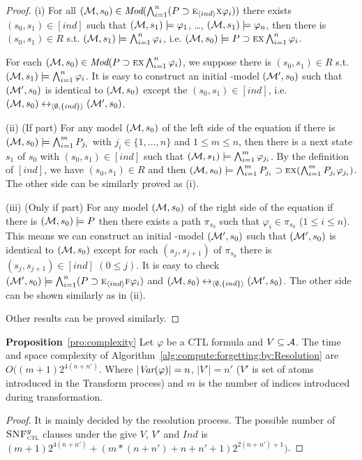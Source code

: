 \documentclass[letterpaper]{article} %
\begin{document}
\begin{proof}
(i)  For all $({\cal M}, s_0) \in \textit{Mod}(\bigwedge_{i=1}^n (P\supset \textsc{e}_{{\langle{ind}\rangle}} \textsc{x} \varphi_i))$ there exists $(s_0, s_1)\in [ind]$ such that $({\cal M}, s_1) \models \varphi_1$, \dots, $({\cal M}, s_1) \models \varphi_n$, then there is $(s_0, s_1)\in R$ s.t. $({\cal M}, s_1) \models \bigwedge_{i=1}^n \varphi_i$, i.e. $({\cal M}, s_0) \models P\supset \textsc{e} \textsc{x} \bigwedge_{i=1}^n \varphi_i$.

For each $({\cal M}, s_0) \in \textit{Mod}(P\supset \textsc{e} \textsc{x} \bigwedge_{i=1}^n \varphi_i)$, we suppose there is $(s_0, s_1)\in R$ s.t. $({\cal M}, s_1) \models \bigwedge_{i=1}^n \varphi_i$. It is easy to construct an initial \Ind-model $({\cal M}', s_0)$ such that $({\cal M}', s_0)$ is identical to $({\cal M}, s_0)$ except the $(s_0, s_1) \in [ind]$, i.e. $({\cal M}, s_0) \leftrightarrow_{{\langle{\emptyset, \{ind\}}\rangle}} ({\cal M}', s_0)$.

(ii) (If part) For any model $({\cal M},s_0)$ of the left side of the equation if there is $({\cal M},s_0) \models \bigwedge_{i=1}^m P_{j_i}$ with $j_i \in \{1, \dots, n\}$ and $1\leq m \leq n$, then there is a next state $s_1$ of $s_0$ with $(s_0, s_1) \in [ind]$ such that $({\cal M}, s_1) \models \bigwedge_{i=1}^m \varphi_{j_i}$. By the definition of $[ind]$, we have $(s_0, s_1) \in R$ and then $({\cal M}, s_0) \models \bigwedge_{i=1}^m P_{j_i} \supset \textsc{e} \textsc{x} (\bigwedge_{i=1}^m P_{j_i} \varphi_{j_i})$. The other side can be similarly proved as (i).

(iii) (Only if part) For any model $({\cal M},s_0)$ of the right side of the equation if there is $({\cal M},s_0) \models P$ then there exists a path $\pi_{s_0}$ such that $\varphi_i \in \pi_{s_0}$ ($1\leq i \leq n$). This means we can construct an initial \Ind-model $({\cal M}', s_0)$ such that $({\cal M}', s_0)$ is identical to $({\cal M}, s_0)$ except for each $(s_j, s_{j+1})$ of $\pi_{s_0}$ there is $(s_j, s_{j+1}) \in [ind]$ $(0\leq j)$. It is easy to check $({\cal M}', s_0) \models \bigwedge_{i=1}^n (P\supset \textsc{e}_{{\langle{ind}\rangle}} \textsc{f} \varphi_i)$ and  $({\cal M}, s_0) \leftrightarrow_{{\langle{\emptyset, \{ind\}}\rangle}} ({\cal M}', s_0)$.  The other side can be shown similarly as in (ii).

Other results can be proved similarly.
\end{proof}


\noindent\textbf{Proposition}~\ref{pro:complexity}
Let $\varphi$ be a CTL formula and $V \subseteq {\cal A}$.
The time and space complexity of Algorithm~\ref{alg:compute:forgetting:by:Resolution} are $O((m+1)2^{4(n+n')}$. Where $|\textit{Var}(\varphi)|=n$, $|V'|=n'$ ($V'$ is set of atoms introduced in the Transform process) and $m$ is the number of indices introduced during transformation.
\begin{proof}
It is mainly decided by the resolution process.
The possible number of ${\textsc{SNF}_{\textsc{ctl}}^g}$ clauses under the give $V$, $V'$ and $Ind$ is $(m+1)2^{4(n+n')}+(m*(n+n')+n+n'+1)2^{2(n+n')+1})$.
\end{proof}
\end{document}
